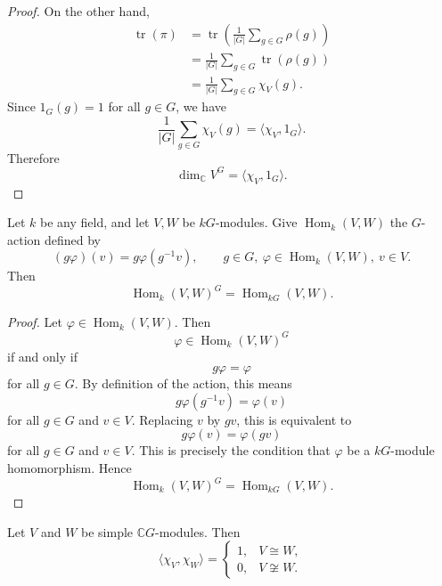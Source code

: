 \begin{proof}
    On the other hand,
    \[
        \begin{aligned}
            \operatorname{tr}(\pi)
             & =
            \operatorname{tr}\left(
            \frac{1}{|G|}
            \sum_{g\in G}\rho(g)
            \right)                                 \\
             & =
            \frac{1}{|G|}
            \sum_{g\in G}\operatorname{tr}(\rho(g)) \\
             & =
            \frac{1}{|G|}
            \sum_{g\in G}\chi_V(g).
        \end{aligned}
    \]
    Since \(1_G(g)=1\) for all \(g\in G\), we have
    \[
        \frac{1}{|G|}
        \sum_{g\in G}\chi_V(g)
        =
        \langle \chi_V,1_G\rangle.
    \]
    Therefore
    \[
        \dim_{\mathbb{C}}V^G
        =
        \langle \chi_V,1_G\rangle.
    \]
\end{proof}

\begin{lemma}
    Let \(k\) be any field, and let \(V,W\) be \(kG\)-modules. Give
    \(\operatorname{Hom}_k(V,W)\) the \(G\)-action defined by
    \[
        (g\varphi)(v)
        =
        g\varphi(g^{-1}v),
        \qquad
        g\in G,\ \varphi\in\operatorname{Hom}_k(V,W),\ v\in V.
    \]
    Then
    \[
        \operatorname{Hom}_k(V,W)^G
        =
        \operatorname{Hom}_{kG}(V,W).
    \]
\end{lemma}

\begin{proof}
    Let \(\varphi\in \operatorname{Hom}_k(V,W)\). Then
    \[
        \varphi\in \operatorname{Hom}_k(V,W)^G
    \]
    if and only if
    \[
        g\varphi=\varphi
    \]
    for all \(g\in G\). By definition of the action, this means
    \[
        g\varphi(g^{-1}v)=\varphi(v)
    \]
    for all \(g\in G\) and \(v\in V\). Replacing \(v\) by \(gv\), this is
    equivalent to
    \[
        g\varphi(v)=\varphi(gv)
    \]
    for all \(g\in G\) and \(v\in V\). This is precisely the condition that
    \(\varphi\) be a \(kG\)-module homomorphism. Hence
    \[
        \operatorname{Hom}_k(V,W)^G
        =
        \operatorname{Hom}_{kG}(V,W).
    \]
\end{proof}

\begin{theorem}
    Let \(V\) and \(W\) be simple \(\mathbb{C}G\)-modules. Then
    \[
        \langle \chi_V,\chi_W\rangle
        =
        \begin{cases}
            1, & V\cong W,     \\
            0, & V\not\cong W.
        \end{cases}
    \]
\end{theorem}

